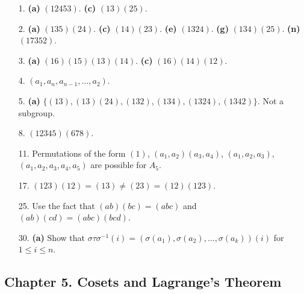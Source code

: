 {\small
\begin{itemize}
 
 
\bf\item[1.]\rm
{\bf (a)} $(12453)$.
{\bf (c)} $(13)(25)$.
 
 
\bf\item[2.]\rm
{\bf (a)} $(135)(24)$.
{\bf (c)} $(14)(23)$.
{\bf (e)} $(1324)$.
{\bf (g)} $(134)(25)$.
{\bf (n)} $(17352)$. 
 
 
\bf\item[3.]\rm
{\bf (a)} $(16)(15)(13)(14)$.
{\bf (c)} $(16)(14)(12)$.
 
\bf\item[4.]\rm
$(a_1, a_{n}, a_{n-1}, \ldots, a_2)$.
  
 
\bf\item[5.]\rm
{\bf (a)} $\{ (13), (13)(24), (132), (134), (1324), (1342) \}$. 
Not a subgroup.
 
 
\bf\item[8.]\rm
$(12345)(678)$.
 
 
\bf\item[11.]\rm
Permutations of the form $(1)$, $(a_1, a_2)(a_3, a_4)$, 
$(a_1, a_2, a_3)$, $(a_1, a_2, a_3, a_4, a_5)$ are possible for $A_5$.
 
\bf\item[17.]\rm
$(123)(12) = (13) \neq (23) = (12)(123)$.
 
 
\bf\item[25.]\rm
Use the fact that $(ab)(bc) = (abc)$ and $(ab)(cd) = (abc)(bcd)$.
 
 
\bf\item[30.]\rm
{\bf (a)} 
Show that $\sigma \tau \sigma^{-1 }(i) = ( \sigma(a_1), 
\sigma(a_2), \ldots, \sigma(a_k))(i)$ for $1 \leq i \leq n$.
 
 
\end{itemize}
}
 
\subsection*{Chapter 5. Cosets and Lagrange's Theorem}
 
